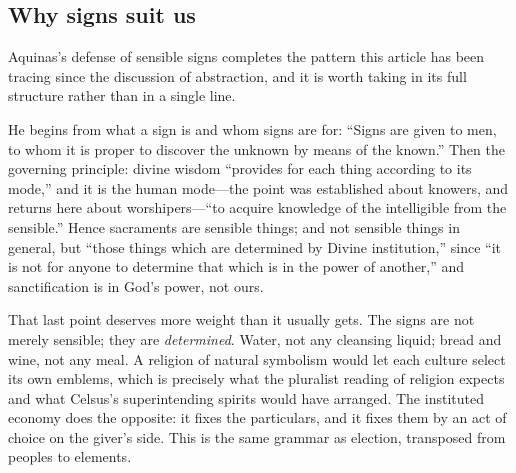 \subsection{Why signs suit us}

Aquinas's defense of sensible signs completes the pattern this article has been tracing since the discussion of abstraction, and it is worth taking in its full structure rather than in a single line.

He begins from what a sign is and whom signs are for: ``Signs are given to men, to whom it is proper to discover the unknown by means of the known.'' Then the governing principle: divine wisdom ``provides for each thing according to its mode,'' and it is the human mode---the point was established about knowers, and returns here about worshipers---``to acquire knowledge of the intelligible from the sensible.'' Hence sacraments are sensible things; and not sensible things in general, but ``those things which are determined by Divine institution,'' since ``it is not for anyone to determine that which is in the power of another,'' and sanctification is in God's power, not ours.

That last point deserves more weight than it usually gets. The signs are not merely sensible; they are \emph{determined}. Water, not any cleansing liquid; bread and wine, not any meal. A religion of natural symbolism would let each culture select its own emblems, which is precisely what the pluralist reading of religion expects and what Celsus's superintending spirits would have arranged. The instituted economy does the opposite: it fixes the particulars, and it fixes them by an act of choice on the giver's side. This is the same grammar as election, transposed from peoples to elements.

